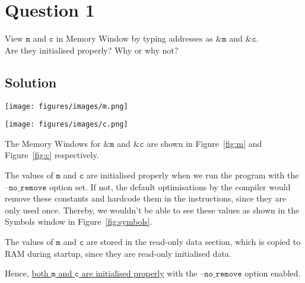 \section*{Question 1}

View \(\texttt{m}\) and \(\texttt{c}\) in Memory Window by typing addresses as \(\texttt{\&m}\) and \(\texttt{\&c}\).\\
Are they initialised properly?
Why or why not?

\subsection*{Solution}

\begin{figure*}[htbp]
    \centering
    \texttt{[image: figures/images/m.png]}
    \caption{
        Memory Window for \texttt{\&m}.
        \( \quad \texttt{m} = \hex{0x00000007} \)
    }\label{fig:m}
\end{figure*}

\begin{figure*}[htbp]
    \centering
    \texttt{[image: figures/images/c.png]}
    \caption{
        Memory Window for \texttt{\&c}.
        \( \quad \texttt{c} = \hex{0x0000000B} \)
    }\label{fig:c}
\end{figure*}

The Memory Windows for \(\texttt{\&m}\) and \(\texttt{\&c}\) are shown in Figure~\ref{fig:m} and Figure~\ref{fig:c} respectively.

The values of \(\texttt{m}\) and \(\texttt{c}\) are initialised properly when we run the program with the \( \texttt{--no\_remove} \) option set.
If not, the default optimisations by the compiler would remove these constants and hardcode them in the instructions, since they are only used once.
Thereby, we wouldn't be able to see these values as shown in the Symbols window in Figure~\ref{fig:symbols}.

The values of \(\texttt{m}\) and \(\texttt{c}\) are stored in the read-only data section, which is copied to RAM during startup, since they are read-only initialised data.

Hence, \underline{both \(\texttt{m}\) and \(\texttt{c}\) are initialised properly} with the \( \texttt{--no\_remove} \) option enabled.
